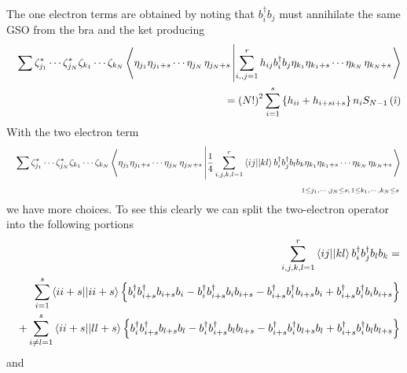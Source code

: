 \documentclass{article}
\begin{document}
The one electron terms are obtained by noting that $b_{i}^{\dagger }b_{j}$
must annihilate the same GSO from the bra and the ket producing 
\begin{eqnarray}
&&\sum \zeta _{j_{1}}^{\ast }\cdots \zeta _{j_{N}}^{\ast }\zeta
_{k_{1}}\cdots \zeta _{k_{N}}\left\langle \eta _{j_{1}}\eta _{j_{1}+s}\cdots
\eta _{j_{N}\,}\eta _{j_{N}+s}\left| \sum_{i,,j=1}^{r}h_{ij}b_{i}^{\dagger
}b_{j}\eta _{k_{1}}\eta _{k_{1}+s}\cdots \eta _{k_{N}\,}\eta
_{k_{N}+s}\right. \right\rangle  \notag \\
&&\left. {}\right. \qquad \qquad \qquad \qquad \qquad \qquad \qquad =\left(
N!\right) ^{2}\sum_{i=1}^{s}\left\{ h_{ii}+h_{i+si+s}\right\}
n_{i}S_{N-1}\left( \hat{\imath}\right)
\end{eqnarray}%
With the two electron term 
\begin{eqnarray}
&&\sum \zeta _{j_{1}}^{\ast }\cdots \zeta _{j_{N}}^{\ast }\zeta
_{k_{1}}\cdots \zeta _{k_{N}}\left\langle \eta _{j_{1}}\eta _{j_{1}+s}\cdots
\eta _{j_{N}\,}\eta _{j_{N}+s}\left| \frac{1}{4}\sum_{i,j,k,l=1}^{r}\left%
\langle ij||kl\right\rangle b_{i}^{\dagger }b_{j}^{\dagger }b_{l}b_{k}\eta
_{k_{1}}\eta _{k_{1}+s}\cdots \eta _{k_{N}\,}\eta _{k_{N}+s}\right.
\right\rangle  \notag \\
&&\qquad \qquad \qquad \qquad \qquad \qquad \qquad \qquad \qquad \qquad
\qquad \qquad \qquad \quad _{1\leq j_{1},\cdots ,j_{N}\leq s;\,1\leq
k_{1},\cdots ,k_{N}\leq s\,}
\end{eqnarray}%
we have more choices. To see this clearly we can split the two-electron
operator into the following portions%
\begin{eqnarray}
&&\sum_{i,j,k,l=1}^{r}\left\langle ij||kl\right\rangle b_{i}^{\dagger
}b_{j}^{\dagger }b_{l}b_{k}=  \notag \\
&&\left. {}\right. \sum_{i=1}^{s}\left\langle ii+s||ii+s\right\rangle
\left\{ b_{i}^{\dagger }b_{i+s}^{\dagger }b_{i+s}b_{i}-b_{i}^{\dagger
}b_{i+s}^{\dagger }b_{i}b_{i+s}-b_{i+s}^{\dagger }b_{i}^{\dagger
}b_{i+s}b_{i}+b_{i+s}^{\dagger }b_{i}^{\dagger }b_{i}b_{i+s}\right\}  \notag
\\
&&+\sum_{i\neq l=1}^{s}\left\langle ii+s||ll+s\right\rangle \left\{
b_{i}^{\dagger }b_{i+s}^{\dagger }b_{l+s}b_{l}-b_{i}^{\dagger
}b_{i+s}^{\dagger }b_{l}b_{l+s}-b_{i+s}^{\dagger }b_{i}^{\dagger
}b_{l+s}b_{l}+b_{i+s}^{\dagger }b_{i}^{\dagger }b_{l}b_{l+s}\right\}
\label{twoel1}
\end{eqnarray}%
and 
\end{document}
